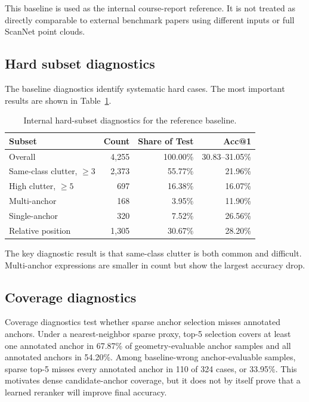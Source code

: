 \documentclass[11pt]{article}
\makeatletter
\newcommand{\acc}{Acc@1}
\makeatother
\begin{document}
This baseline is used as the internal course-report reference. It is not treated as directly comparable to external benchmark papers using different inputs or full ScanNet point clouds.

\subsection{Hard subset diagnostics}

The baseline diagnostics identify systematic hard cases. The most important results are shown in Table~\ref{tab:hard_subsets}.

\begin{table}[t]
\centering
\small
\caption{Internal hard-subset diagnostics for the reference baseline.}
\label{tab:hard_subsets}
\begin{tabular}{lrrr}
\toprule
Subset & Count & Share of Test & \acc{} \\
\midrule
Overall & 4,255 & 100.00\% & 30.83--31.05\% \\
Same-class clutter, $\geq 3$ & 2,373 & 55.77\% & 21.96\% \\
High clutter, $\geq 5$ & 697 & 16.38\% & 16.07\% \\
Multi-anchor & 168 & 3.95\% & 11.90\% \\
Single-anchor & 320 & 7.52\% & 26.56\% \\
Relative position & 1,305 & 30.67\% & 28.20\% \\
\bottomrule
\end{tabular}
\end{table}

The key diagnostic result is that same-class clutter is both common and difficult. Multi-anchor expressions are smaller in count but show the largest accuracy drop.

\subsection{Coverage diagnostics}

Coverage diagnostics test whether sparse anchor selection misses annotated anchors. Under a nearest-neighbor sparse proxy, top-5 selection covers at least one annotated anchor in 67.87\% of geometry-evaluable anchor samples and all annotated anchors in 54.20\%. Among baseline-wrong anchor-evaluable samples, sparse top-5 misses every annotated anchor in 110 of 324 cases, or 33.95\%. This motivates dense candidate-anchor coverage, but it does not by itself prove that a learned reranker will improve final accuracy.
\end{document}
